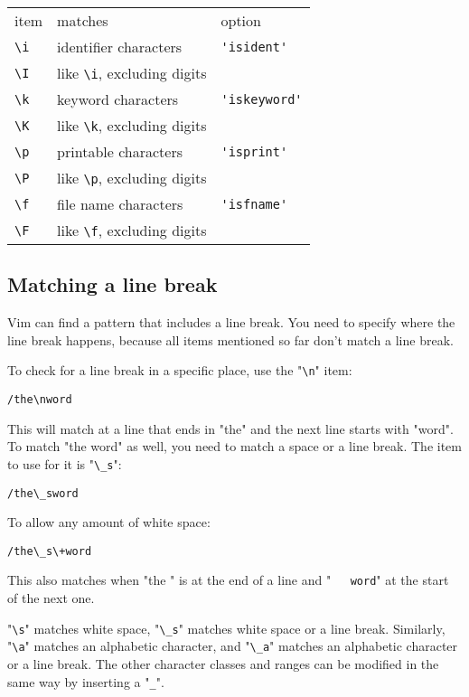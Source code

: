 \begin{center} \begin{tabular}{l l l}
				item & matches & option \\
				\verb!\i! & identifier characters & \verb!'isident'! \\
				\verb!\I! & like \verb!\i!, excluding digits & \\
				\verb!\k! & keyword characters & \verb!'iskeyword'! \\
				\verb!\K! & like \verb!\k!, excluding digits & \\
				\verb!\p! & printable characters & \verb!'isprint'! \\
				\verb!\P! & like \verb!\p!, excluding digits & \\
				\verb!\f! & file name characters & \verb!'isfname'! \\
				\verb!\F! & like \verb!\f!, excluding digits & \\
\end{tabular} \end{center}
\subsection{Matching a line break}
Vim can find a pattern that includes a line break.
You need to specify where the line break happens, because all items mentioned so far don't match a line break.

To check for a line break in a specific place, use the "\verb!\n!" item:

\begin{Verbatim}[samepage=true]
 /the\nword
\end{Verbatim}

This will match at a line that ends in "the" and the next line starts with "word".
To match "the word" as well, you need to match a space or a line break.
The item to use for it is "\verb!\_s!":

\begin{Verbatim}[samepage=true]
 /the\_sword
\end{Verbatim}

To allow any amount of white space:

\begin{Verbatim}[samepage=true]
 /the\_s\+word
\end{Verbatim}

This also matches when "the  " is at the end of a line and "\verb!   word!" at the start of the next one.

"\verb!\s!" matches white space, "\verb!\_s!" matches white space or a line break.
Similarly, "\verb!\a!" matches an alphabetic character, and "\verb!\_a!" matches an alphabetic character or a line break.
The other character classes and ranges can be modified in the same way by inserting a "\verb!_!".

